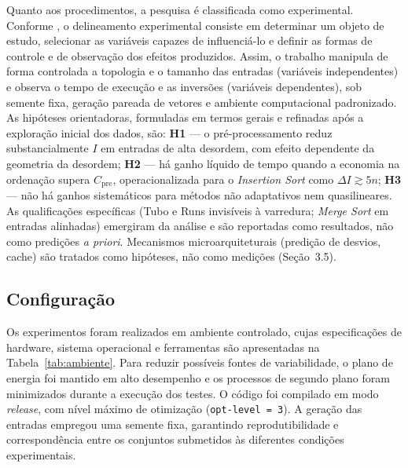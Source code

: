 \documentclass[portuguese]{sbc2025}%
\begin{document}
Quanto aos procedimentos, a pesquisa é classificada como experimental. Conforme \citet{gil_metodos_2019}, o delineamento experimental consiste em determinar um objeto de estudo, selecionar as variáveis capazes de influenciá-lo e definir as formas de controle e de observação dos efeitos produzidos. Assim, o trabalho manipula de forma controlada a topologia e o tamanho das entradas (variáveis independentes) e observa o tempo de execução e as inversões (variáveis dependentes), sob semente fixa, geração pareada de vetores e ambiente computacional padronizado. As hipóteses orientadoras, formuladas em termos gerais e refinadas após a exploração inicial dos dados, são: \textbf{H1} — o pré-processamento reduz substancialmente $I$ em entradas de alta desordem, com efeito dependente da geometria da desordem; \textbf{H2} — há ganho líquido de tempo quando a economia na ordenação supera $C_{\text{pre}}$, operacionalizada para o \emph{Insertion Sort} como $\Delta I \gtrsim 5n$; \textbf{H3} — não há ganhos sistemáticos para métodos não adaptativos nem quasilineares. As qualificações específicas (Tubo e Runs invisíveis à varredura; \emph{Merge Sort} em entradas alinhadas) emergiram da análise e são reportadas como resultados, não como predições \emph{a priori}. Mecanismos microarquiteturais (predição de desvios, cache) são tratados como hipóteses, não como medições (Seção~3.5).

\subsection{Configuração}

Os experimentos foram realizados em ambiente controlado, cujas especificações de hardware, sistema operacional e ferramentas são apresentadas na Tabela~\ref{tab:ambiente}. Para reduzir possíveis fontes de variabilidade, o plano de energia foi mantido em alto desempenho e os processos de segundo plano foram minimizados durante a execução dos testes. O código foi compilado em modo \emph{release}, com nível máximo de otimização (\texttt{opt-level = 3}). A geração das entradas empregou uma semente fixa, garantindo reprodutibilidade e correspondência entre os conjuntos submetidos às diferentes condições experimentais.
\end{document}
